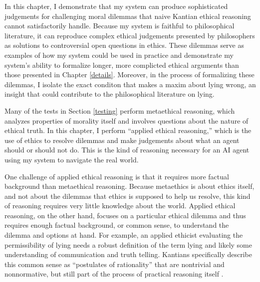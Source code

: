 %
\begin{isabellebody}%
%
%
\isadelimtheory
%
\endisadelimtheory
%
\isatagtheory
%
\endisatagtheory
{\isafoldtheory}%
%
\isadelimtheory
%
\endisadelimtheory
%
\isadelimdocument
%
\endisadelimdocument
%
\isatagdocument
%
\isamarkuptrue%
%
\endisatagdocument
{\isafolddocument}%
%
\isadelimdocument
%
\endisadelimdocument
%
\begin{isamarkuptext}%
In this chapter, I demonstrate that my system can produce sophisticated judgements for challenging moral 
dilemmas that naive Kantian ethical reasoning cannot satisfactorily handle. Because my system is faithful to
philosophical literature, it can reproduce complex ethical judgements presented by philosophers as 
solutions to controversial open questions in ethics. These dilemmas serve as examples of how my system could be used
in practice and demonstrate my system's ability to formalize longer, more complicted ethical arguments
than those presented in Chapter \ref{details}. Moreover, in the process of formalizing these dilemmas, 
I isolate the exact conditon that makes a maxim about lying wrong, an insight that could contribute to 
the philosophical literature on lying.

Many of the tests in Section \ref{testing} perform metaethical reasoning, which analyzes properties
of morality itself and involves questions about the nature of ethical truth. In this chapter, I perform
``applied ethical reasoning,'' which is the use of ethics to resolve dilemmas and make judgements about 
what an agent should or should not do. This is the kind of reasoning necessary for an AI agent using my system to
navigate the real world.

One challenge of applied ethical reasoning is that it requires more factual background than metaethical
reasoning. Because metaethics is about ethics itself, and not about the dilemmas that ethics is 
supposed to help us resolve, this kind of reasoning requires very little knowledge about the world. 
Applied ethical reasoning, on the other hand,
focuses on a particular ethical dilemma and thus requires enough factual background, or common sense, 
to understand the dilemma and options at hand. For example, an applied ethicist 
evaluating the permissibility of lying needs a robust definition of the term lying and likely some
understanding of communication and truth telling. Kantians specifically describe
this common sense as ``postulates of rationality'' that are nontrivial and nonnormative, but still
part of the process of practical reasoning itself \citep{silber}. 


\end{isamarkuptext}
\end{isabellebody}
